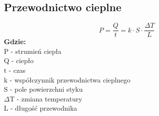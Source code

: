 \documentclass{article}
\begin{document}
        \subsection{Przewodnictwo cieplne}
            \begin{equation}
                P = \frac{Q}{t} = k \cdotp S \cdotp \frac{\Delta T}{L}
            \end{equation}
            \textbf{Gdzie:}\\
                P - strumień ciepła \\
                Q - ciepło  \\
                t - czas\\
                k - współczynnik przewodnictwa cieplnego\\
                S - pole powierzchni styku\\
                $\Delta$T - zmiana temperatury\\
                L - długość przewodnika\\
\end{document}

